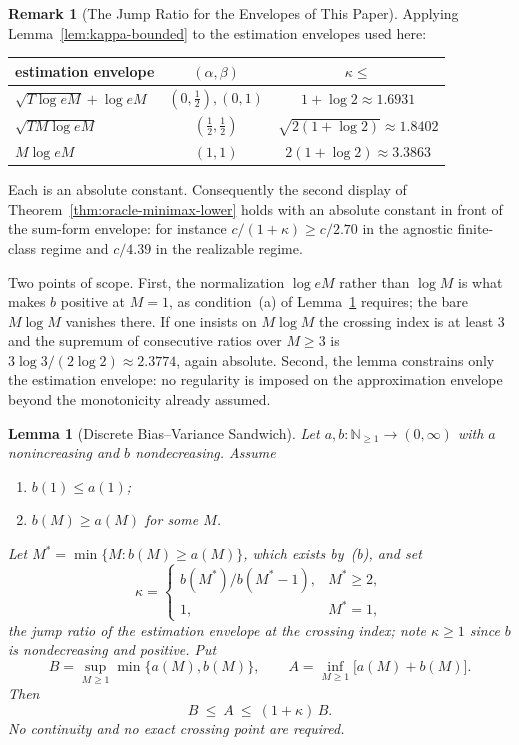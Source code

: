 \documentclass[12pt]{article}
\newtheorem{lemma}[theorem]{Lemma}
\theoremstyle{definition}
\newtheorem{remark}[theorem]{Remark}
\begin{document}
\begin{remark}[The Jump Ratio for the Envelopes of This Paper]
\label{rem:kappa-values}
Applying Lemma~\ref{lem:kappa-bounded} to the estimation envelopes used here:

\begin{center}
\begin{tabular}{lcc}
\toprule
estimation envelope & $(\alpha,\beta)$ & $\kappa\le$ \\
\midrule
$\sqrt{T\log eM}+\log eM$ & $(0,\tfrac12),(0,1)$ & $1+\log2\approx1.6931$ \\
$\sqrt{TM\log eM}$        & $(\tfrac12,\tfrac12)$ & $\sqrt{2(1+\log2)}\approx1.8402$ \\
$M\log eM$                & $(1,1)$               & $2(1+\log2)\approx3.3863$ \\
\bottomrule
\end{tabular}
\end{center}

\noindent
Each is an absolute constant.  Consequently the second display of
Theorem~\ref{thm:oracle-minimax-lower} holds with an absolute constant in front
of the sum-form envelope: for instance $c/(1+\kappa)\ge c/2.70$ in the agnostic
finite-class regime and $c/4.39$ in the realizable regime.

Two points of scope.  First, the normalization $\log eM$ rather than $\log M$
is what makes $b$ positive at $M=1$, as condition~(a) of
Lemma~\ref{lem:discrete-bv-sandwich} requires; the bare $M\log M$ vanishes
there.  If one insists on $M\log M$ the crossing index is at least $3$ and the
supremum of consecutive ratios over $M\ge3$ is $3\log3/(2\log2)\approx2.3774$,
again absolute.  Second, the lemma constrains only the estimation envelope:
no regularity is imposed on the approximation envelope beyond the monotonicity
already assumed.
\end{remark}

\begin{lemma}[Discrete Bias--Variance Sandwich]
\label{lem:discrete-bv-sandwich}
Let $a,b:\mathbb N_{\ge1}\to(0,\infty)$ with $a$ nonincreasing and $b$
nondecreasing.  Assume
\begin{enumerate}[label=(\alph*)]
\item $b(1)\le a(1)$;
\item $b(M)\ge a(M)$ for some $M$.
\end{enumerate}
Let $M^\ast=\min\{M:b(M)\ge a(M)\}$, which exists by~(b), and set
\[
\kappa
=
\begin{cases}
b(M^\ast)/b(M^\ast-1), & M^\ast\ge2,\\
1, & M^\ast=1,
\end{cases}
\]
the \emph{jump ratio} of the estimation envelope at the crossing index; note
$\kappa\ge1$ since $b$ is nondecreasing and positive.  Put
\[
B=\sup_{M\ge1}\min\{a(M),b(M)\},
\qquad
A=\inf_{M\ge1}\bigl[a(M)+b(M)\bigr].
\]
Then
\[
B\ \le\ A\ \le\ (1+\kappa)\,B .
\]
No continuity and no exact crossing point are required.
\end{lemma}
\end{document}
